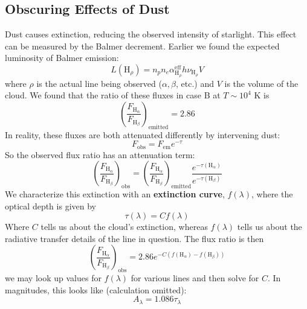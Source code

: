 \documentclass[10pt]{article}
\numberwithin{equation}{section}
\begin{document}
\subsection{Obscuring Effects of Dust} %
\label{sub:obscuring_effects_of_dust}
Dust causes extinction, reducing the observed intensity of starlight. This
effect can be measured by the Balmer decrement. Earlier we found the expected
luminosity of Balmer emission:
\begin{equation}
  \label{eq:dust:1} L(\mathrm{H}_\rho) = n_p n_e
  \alpha^{\mathrm{eff}}_{\mathrm{H}_\rho}h\nu_{\mathrm{H}_\rho} V
\end{equation}
where $\rho$ is the actual line being observed ($\alpha, \beta$, etc.) and $V$
is the volume of the cloud. We found that the ratio of these fluxes in case B at
$T\sim 10^4$ K is
\begin{equation}
  \label{eq:dust:2} \left(\frac{F_{\mathrm{H}_\alpha}}
  {F_{\mathrm{H}_\beta}}\right)_{\mathrm{emitted}} = 2.86
\end{equation}
In reality, these fluxes are both attenuated differently by intervening dust:
\begin{equation}
  \label{eq:dust:3} F_{\mathrm{obs}}=F_{\mathrm{em}}e^{-\tau}
\end{equation}
So the observed flux ratio has an attenuation term:
\begin{equation}
  \label{eq:dust:4} \left(\frac{F_{\mathrm{H}_\alpha}}
  {F_{\mathrm{H}_\beta}}\right)_{\mathrm{obs}} =
  \left(\frac{F_{\mathrm{H}_\alpha}}
  {F_{\mathrm{H}_\beta}}\right)_{\mathrm{emitted}}
  \frac{e^{-\tau(\mathrm{H}_\alpha)}}{e^{-\tau(\mathrm{H}_\beta)}}
\end{equation}
We characterize this extinction with an \textbf{extinction curve}, $f(\lambda)$,
where the optical depth is given by
\begin{equation}
  \label{eq:dust:5} \tau(\lambda) = C f(\lambda)
\end{equation}
Where $C$ tells us about the cloud's extinction, whereas $f(\lambda)$ tells us
about the radiative transfer details of the line in question. The flux ratio is
then
\begin{equation}
  \label{eq:dust:6} \left(\frac{F_{\mathrm{H}_\alpha}}
  {F_{\mathrm{H}_\beta}}\right)_{\mathrm{obs}} = 2.86
  e^{-C\left(f(\mathrm{H}_\alpha)-f(\mathrm{H}_\beta)\right)}
\end{equation}
we may look up values for $f(\lambda)$ for various lines and then solve for
$C$. In magnitudes, this looks like (calculation omitted):
\begin{equation}
  \label{eq:dust:7} A_\lambda = 1.086 \tau_\lambda
\end{equation}
\end{document}
